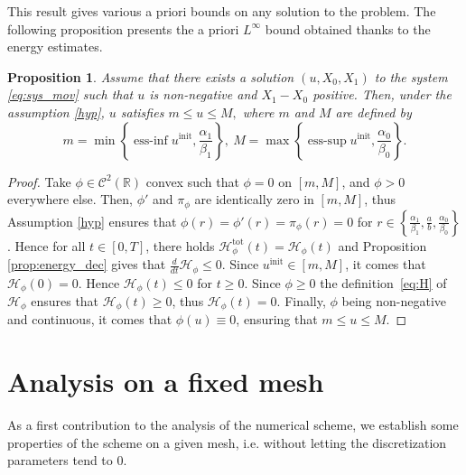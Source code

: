 \documentclass{amsart}
\newcommand\R{\mathbb{R}}
\renewcommand\H{\mathcal{H}_{\phi}}
\newtheorem{proposition}[theorem]{Proposition}
\begin{document}
	This result gives various a priori bounds on any solution to the problem. The following proposition presents the a priori $L^\infty$ bound obtained thanks to the energy estimates.
	\begin{proposition} \label{prop:u_bounds}
		Assume that there exists a solution $(u, X_0, X_1)$ to the system \eqref{eq:sys_mov} such that $u$ is non-negative and $X_1-X_0$ positive. Then, under the assumption \eqref{hyp}, $u$ satisfies
		\(
			m \leq u \leq M, 
		\)
		where $m$ and $M$ are defined by
		\begin{equation} \label{eq:def_Linf_bounds}
			m = \min \left \{\operatorname{ess-inf} u^\text{init}, \frac{\alpha_1}{\beta_1}\right \}, \: M = \max \left \{\operatorname{ess-sup} u^\text{init}, \frac{\alpha_0}{\beta_0} \right \}.
		\end{equation}
	\end{proposition}
	\begin{proof}
		Take $\phi \in \mathcal{C}^2(\R)$ convex such that $\phi = 0$ on $[m,M]$, and $\phi > 0$ everywhere else. Then, $\phi'$ and $\pi_\phi$ are identically zero in $[m,M]$, thus Assumption \eqref{hyp} ensures that $\phi(r) = \phi'(r)= \pi_\phi(r)=0$ for $r \in \left \{ \frac{\alpha_1}{\beta_1}, \frac{a}{b}, \frac{\alpha_0}{\beta_0}\right\}$. Hence for all $t \in [0,T]$, there holds $\H^{\text{tot}}(t) =\H(t)$ and
		Proposition \ref{prop:energy_dec} gives that $\frac{d}{dt}\H \leq 0$. Since $u^\text{init} \in [m, M]$, it comes that $\H(0) = 0$. Hence $\H(t) \leq 0$ for $t \geq 0$. Since $\phi \geq 0$ the definition~\eqref{eq:H} of $\H$ ensures that $\H(t) \geq 0$, thus $\H(t) = 0.$
		Finally, $\phi$ being non-negative and continuous, it comes that \(\phi(u) \equiv 0\), ensuring that  $m \leq u \leq M$.
	\end{proof}
\section{Analysis on a fixed mesh}
As a first contribution to the analysis of the numerical scheme, we establish some properties of the scheme on a given mesh, i.e. without letting the discretization parameters tend to $0$. 
\end{document}
